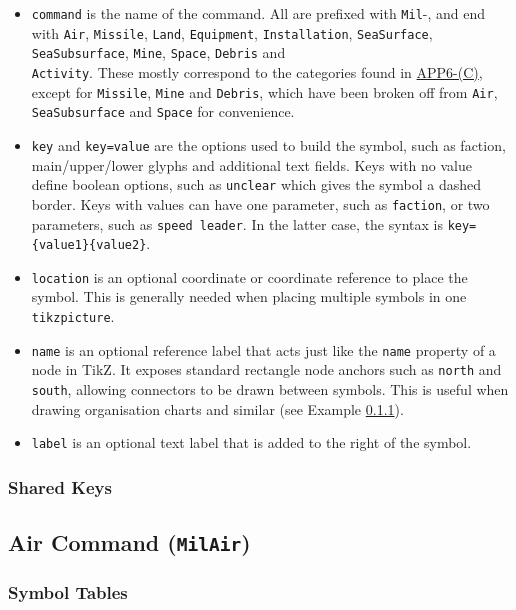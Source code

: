 \documentclass[a4paper, titlepage]{article}
\begin{document}
\begin{itemize}
\item \texttt{command} is the name of the command. All are prefixed with \texttt{Mil}-, and end with \texttt{Air}, \texttt{Missile}, \texttt{Land}, \texttt{Equipment}, \texttt{Installation}, \texttt{SeaSurface}, \texttt{SeaSubsurface}, \texttt{Mine}, \texttt{Space}, \texttt{Debris} and\\ \texttt{Activity}. These mostly correspond to the categories found in \href{https://www.awl.edu.pl/images/en/APP_6_C.pdf}{APP6-(C)}, except for \texttt{Missile}, \texttt{Mine} and \texttt{Debris}, which have been broken off from \texttt{Air}, \texttt{SeaSubsurface} and \texttt{Space} for convenience.
\item \texttt{key} and \texttt{key=value} are the options used to build the symbol, such as faction, main/upper/lower glyphs and additional text fields. Keys with no value define boolean options, such as \texttt{unclear} which gives the symbol a dashed border. Keys with values can have one parameter, such as \texttt{faction}, or two parameters, such as \texttt{speed leader}. In the latter case, the syntax is \texttt{key=\{value1\}\{value2\}}.
\item \texttt{location} is an optional coordinate or coordinate reference to place the symbol. This is generally needed when placing multiple symbols in one \texttt{tikzpicture}.
\item \texttt{name} is an optional reference label that acts just like the \texttt{name} property of a node in TikZ. It exposes standard rectangle node anchors such as \texttt{north} and \texttt{south}, allowing connectors to be drawn between symbols. This is useful when drawing organisation charts and similar (see Example \ref{}).
\item \texttt{label} is an optional text label that is added to the right of the symbol.
\end{itemize}

\subsubsection{Shared Keys}

\subsection{Air Command (\textbf{\texttt{MilAir}})}

\subsubsection{Symbol Tables}
\end{document}
